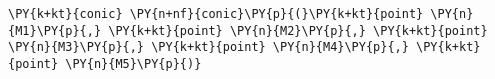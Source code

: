 \begin{Verbatim}[commandchars=\\\{\}]
    \PY{k+kt}{conic} \PY{n+nf}{conic}\PY{p}{(}\PY{k+kt}{point} \PY{n}{M1}\PY{p}{,} \PY{k+kt}{point} \PY{n}{M2}\PY{p}{,} \PY{k+kt}{point} \PY{n}{M3}\PY{p}{,} \PY{k+kt}{point} \PY{n}{M4}\PY{p}{,} \PY{k+kt}{point} \PY{n}{M5}\PY{p}{)}
\end{Verbatim}
